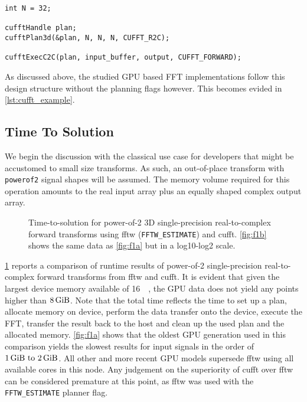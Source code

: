 \begin{lstlisting}[caption={Minimal usage example of the cuFFT single precision real-to-complex planner API. Memory management is omitted.},label={lst:cufft_example}]
int N = 32;

cufftHandle plan;
cufftPlan3d(&plan, N, N, N, CUFFT_R2C);

cufftExecC2C(plan, input_buffer, output, CUFFT_FORWARD);
\end{lstlisting}

As discussed above, the studied GPU based FFT implementations follow this design structure without the planning flags however. This becomes evided in \cref{lst:cufft_example}. 

\subsection{Time To Solution}
\label{ssec:tts}

We begin the discussion with the classical use case for developers that might be accustomed to small size transforms. As such, an out-of-place transform with \texttt{powerof2} signal shapes will be assumed. The memory volume required for this operation amounts to the real input array plus an equally shaped complex output array.   

\begin{figure}[!tbp]
  \centering
  \def\svgwidth{0.95\columnwidth}
  
  \def\svgwidth{0.45\columnwidth}
  \subfloat[Fig A.]{\label{fig:f1a}}
  \hfill
  \def\svgwidth{0.45\columnwidth}
  \subfloat[Fig B.]{\label{fig:f1b}}
  \caption{Time-to-solution for power-of-2 3D single-precision real-to-complex forward transforms using fftw (\texttt{FFTW\_ESTIMATE}) and cufft. \cref{fig:f1b} shows the same data as \cref{fig:f1a} but in a log10-log2 scale.}
  \label{fig:tts}
\end{figure}

\cref{fig:tts} reports a comparison of runtime results of power-of-2 single-precision real-to-complex forward transforms from fftw and cufft. It is evident that given the largest device memory available of  \SI{16}{\gibi\byte}, the GPU data does not yield any points higher than $\SI{8}{\gibi\byte}$. Note that the total time reflects the time to set up a plan, allocate memory on device, perform the data transfer onto the device, execute the FFT, transfer the result back to the host and clean up the used plan and the allocated memory. \cref{fig:f1a} shows that the oldest GPU generation used in this comparison yields the slowest results for input signals in the order of $\SIrange{1}{2}{\gibi\byte}$. All other and more recent GPU models supersede fftw using all available cores in this node. Any judgement on the superiority of cufft over fftw can be considered premature at this point, as fftw was used with the \texttt{FFTW\_ESTIMATE} planner flag.

